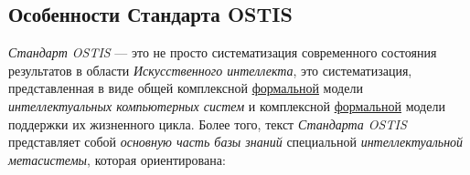 \subsection{Особенности Стандарта OSTIS}
\label{standard_peculiarities}

\textit{Стандарт OSTIS} --- это не просто систематизация современного состояния результатов в области \textit{Искусственного интеллекта}, это систематизация, представленная в виде общей комплексной \uline{формальной} модели \textit{интеллектуальных компьютерных систем} и комплексной \uline{формальной} модели поддержки их жизненного цикла. Более того, текст \textit{Стандарта OSTIS} представляет собой \textit{основную часть базы знаний} специальной \textit{интеллектуальной метасистемы}, которая ориентирована:

